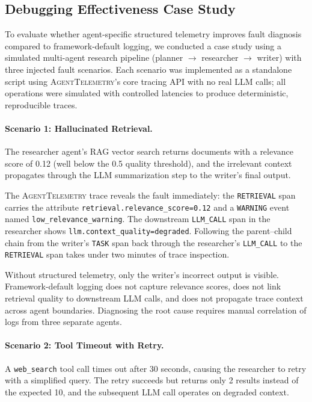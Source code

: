 \documentclass[sigconf,nonacm]{acmart}
\begin{document}
\subsection{Debugging Effectiveness Case Study}
\label{sec:case_study}

To evaluate whether agent-specific structured telemetry improves
fault diagnosis compared to framework-default logging, we conducted a
case study using a simulated multi-agent research pipeline (planner
$\rightarrow$ researcher $\rightarrow$ writer) with three injected fault
scenarios.  Each scenario was implemented as a standalone script using
\textsc{AgentTelemetry}'s core tracing API with no real LLM calls; all
operations were simulated with controlled latencies to produce
deterministic, reproducible traces.

\paragraph{Scenario 1: Hallucinated Retrieval.}
The researcher agent's RAG vector search returns documents with a
relevance score of 0.12 (well below the 0.5 quality threshold), and the
irrelevant context propagates through the LLM summarization step to the
writer's final output.

The \textsc{AgentTelemetry} trace reveals the fault immediately: the
\texttt{RETRIEVAL} span carries the attribute
\texttt{retrieval.relevance\_score=0.12} and a \texttt{WARNING} event
named \texttt{low\_relevance\_warning}.  The downstream
\texttt{LLM\_CALL} span in the researcher shows
\texttt{llm.context\_quality=degraded}.  Following the parent--child
chain from the writer's \texttt{TASK} span back through the researcher's
\texttt{LLM\_CALL} to the \texttt{RETRIEVAL} span takes under two
minutes of trace inspection.

Without structured telemetry, only the writer's incorrect output is
visible.  Framework-default logging does not capture relevance scores,
does not link retrieval quality to downstream LLM calls, and does not
propagate trace context across agent boundaries.  Diagnosing the root
cause requires manual correlation of logs from three separate agents.

\paragraph{Scenario 2: Tool Timeout with Retry.}
A \texttt{web\_search} tool call times out after 30 seconds, causing the
researcher to retry with a simplified query.  The retry succeeds but
returns only 2 results instead of the expected 10, and the subsequent
LLM call operates on degraded context.
\end{document}

